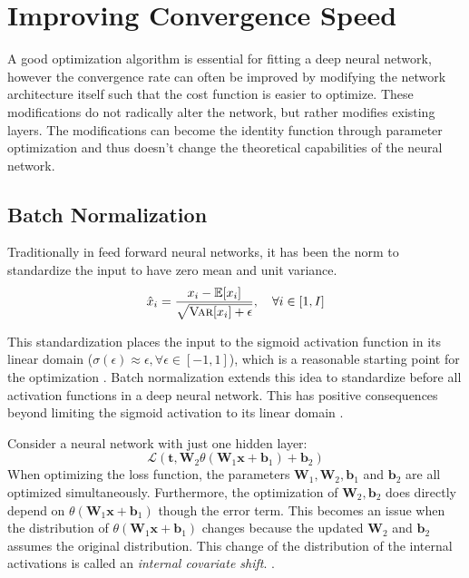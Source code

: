\section{Improving Convergence Speed}
\label{sec:convergence}

A good optimization algorithm is essential for fitting a deep neural network, however the convergence rate can often be improved by modifying the network architecture itself such that the cost function is easier to optimize. These modifications do not radically alter the network, but rather modifies existing layers. The modifications can become the identity function through parameter optimization and thus doesn't change the theoretical capabilities of the neural network.

\subsection{Batch Normalization}
Traditionally in feed forward neural networks, it has been the norm to standardize the input to have zero mean and unit variance.
\begin{equation}
\hat{x}_i = \frac{x_i - \mathbb{E}[x_i]}{\sqrt{\textsc{Var}[x_i] + \epsilon}}, \quad \forall i \in [1, I]
\end{equation}

This standardization places the input to the sigmoid activation function in its linear domain ($\sigma(\epsilon) \approx \epsilon, \forall \epsilon \in [-1, 1]$), which is a reasonable starting point for the optimization . Batch normalization extends this idea to standardize before all activation functions in a deep neural network. This has positive consequences beyond limiting the sigmoid activation to its linear domain \cite{batch-normalization}.

Consider a neural network with just one hidden layer:
\begin{equation}
\mathcal{L}(\mathbf{t}, \mathbf{W}_2 \theta(\mathbf{W}_1 \mathbf{x} + \mathbf{b}_1) + \mathbf{b}_2)
\end{equation}
When optimizing the loss function, the parameters $\mathbf{W}_1, \mathbf{W}_2, \mathbf{b}_1$ and $\mathbf{b}_2$ are all optimized simultaneously. Furthermore, the optimization of $\mathbf{W}_2, \mathbf{b}_2$ does directly depend on $\theta(\mathbf{W}_1 \mathbf{x} + \mathbf{b}_1)$ though the error term. This becomes an issue when the distribution of $\theta(\mathbf{W}_1 \mathbf{x} + \mathbf{b}_1)$ changes because the updated $\mathbf{W}_2$ and $\mathbf{b}_2$ assumes the original distribution. This change of the distribution of the internal activations is called an \textit{internal covariate shift}. \cite{batch-normalization}.

